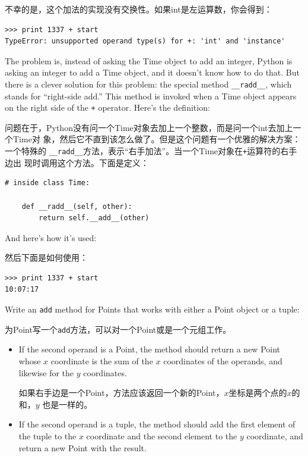 \documentclass[10pt]{book}
\begin{document}
\begin{CJK}{UTF8}{gbsn}
不幸的是，这个加法的实现没有交换性。如果int是左运算数，你会得到：

\begin{verbatim}
>>> print 1337 + start
TypeError: unsupported operand type(s) for +: 'int' and 'instance'
\end{verbatim}
%
The problem is, instead of asking the Time object to add an integer,
Python is asking an integer to add a Time object, and it doesn't know
how to do that.  But there is a clever solution for this problem: the
special method \verb"__radd__", which stands for ``right-side add.''
This method is invoked when a Time object appears on the right side of
the {\tt +} operator.  Here's the definition:

问题在于，Python没有问一个Time对象去加上一个整数，而是问一个int去加上一个Time对
象，然后它不直到该怎么做了。但是这个问题有一个优雅的解决方案：一个特殊的
\verb"__radd__"方法，表示``右手加法''。当一个Time对象在{\tt +}运算符的右手边出
现时调用这个方法。下面是定义：

\begin{verbatim}
# inside class Time:

    def __radd__(self, other):
        return self.__add__(other)
\end{verbatim}
%
And here's how it's used:

然后下面是如何使用：

\begin{verbatim}
>>> print 1337 + start
10:07:17
\end{verbatim}
%

\begin{exercise}

Write an {\tt add} method for Points that works with either a
Point object or a tuple:  

为Point写一个{\tt add}方法，可以对一个Point或是一个元组工作。

\begin{itemize}

\item If the second operand is a Point, the method should return a new
Point whose $x$ coordinate is the sum of the $x$ coordinates of the
operands, and likewise for the $y$ coordinates.

如果右手边是一个Point，方法应该返回一个新的Point，$x$坐标是两个点的$x$的和，$y$
也是一样的。

\item If the second operand is a tuple, the method should add the
first element of the tuple to the $x$ coordinate and the second
element to the $y$ coordinate, and return a new Point with the result. 


\end{itemize}
\end{exercise}
\end{CJK}
\end{document}
